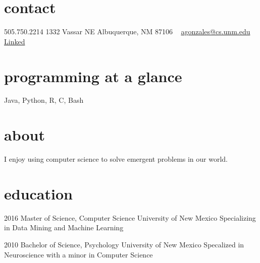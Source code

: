 \documentclass[]{friggeri-cv} %
\begin{document}


\begin{aside} %
\section{contact}
505.750.2214 
1332 Vassar NE
Albuquerque, NM 87106
~
\href{mailto:agonzales@cs.unm.edu}{agonzales@cs.unm.edu}
~
\href{http://lnkd.in/b8kfQSe}{Linked\scriptsize{\faLinkedin}}
\section{programming at a glance}
Java, Python, R, C, Bash
~
\section{about}
I enjoy using computer science to solve emergent problems in our world.
\end{aside}




\section{education}
\begin{entrylist}
\entry
{2016}
{Master of Science, {\normalfont Computer Science}}
{University of New Mexico}
{Specializing in Data Mining and Machine Learning} 
\end{entrylist}

\begin{entrylist}
\entry
{2010}
{Bachelor of Science, {\normalfont Psychology}}
{University of New Mexico}
{Specalized in Neuroscience with a minor in Computer Science}
\end{entrylist}
\end{document}
